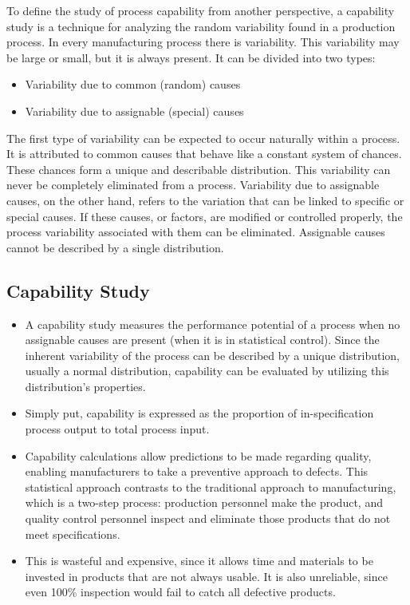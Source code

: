 \documentclass[MASTER-SPC.tex]{subfiles}
\begin{document}
To define the study of process capability from another perspective, a capability study is a technique for analyzing the random variability found in a production process. In every manufacturing process there is variability. This variability may be large or small, but it is always present. It can be divided into two types:

\begin{itemize}
\item Variability due to common (random) causes
\item Variability due to assignable (special) causes
\end{itemize}
The first type of variability can be expected to occur naturally within a process. It is attributed to common causes that behave like a constant system of chances. These chances form a unique and describable distribution. This variability can never be completely eliminated from a process. Variability due to assignable causes, on the other hand, refers to the variation that can be linked to specific or special causes. If these causes, or factors, are modified or controlled properly, the process variability associated with them can be eliminated. Assignable causes cannot be described by a single distribution.
\newpage
\subsection{Capability Study} 
\large
\begin{itemize}
\item A capability study measures the performance potential of a process when no assignable causes are present (when it is in statistical control). Since the inherent variability of the process can be described by a unique distribution, usually a normal distribution, capability can be evaluated by utilizing this distribution’s properties. 
\item Simply put, capability is expressed as the proportion of in-specification process output to total process input.

\item Capability calculations allow predictions to be made regarding quality, enabling manufacturers to take a preventive approach to defects. This statistical approach contrasts to the traditional approach to manufacturing, which is a two-step process: production personnel make the product, and quality control personnel inspect and eliminate those products that do not meet specifications. \item This is wasteful and expensive, since it allows time and materials to be invested in products that are not always usable. It is also unreliable, since even 100\% inspection would fail to catch all defective products.
\end{itemize}
\end{document}
